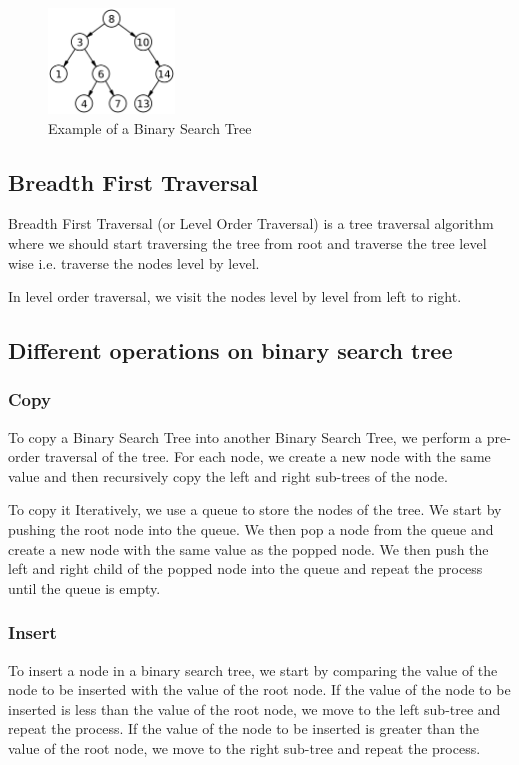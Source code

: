 \documentclass[11pt]{article}
\begin{document}
\begin{figure}[H]
    \centering
    \includegraphics[width=0.30\textwidth]{figures/1200px-Binary_search_tree.svg.png}
    \caption{Example of a Binary Search Tree}
    \label{fig:1200px-Binary_search_tree.svg}
\end{figure}

\subsection{Breadth First Traversal}
Breadth First Traversal (or Level Order Traversal) is a tree traversal algorithm where we should start traversing the tree from root and traverse the tree level wise i.e. traverse the nodes level by level.

In level order traversal, we visit the nodes level by level from left to right.

\subsection{Different operations on binary search tree}

\subsubsection{Copy}
To copy a Binary Search Tree into another Binary Search Tree, we perform a pre-order traversal of the tree. For each node, we create a new node with the same value and then recursively copy the left and right sub-trees of the node.

To copy it Iteratively, we use a queue to store the nodes of the tree. We start by pushing the root node into the queue. We then pop a node from the queue and create a new node with the same value as the popped node. We then push the left and right child of the popped node into the queue and repeat the process until the queue is empty.

\subsubsection{Insert}
To insert a node in a binary search tree, we start by comparing the value of the node to be inserted with the value of the root node. If the value of the node to be inserted is less than the value of the root node, we move to the left sub-tree and repeat the process. If the value of the node to be inserted is greater than the value of the root node, we move to the right sub-tree and repeat the process.
\end{document}
